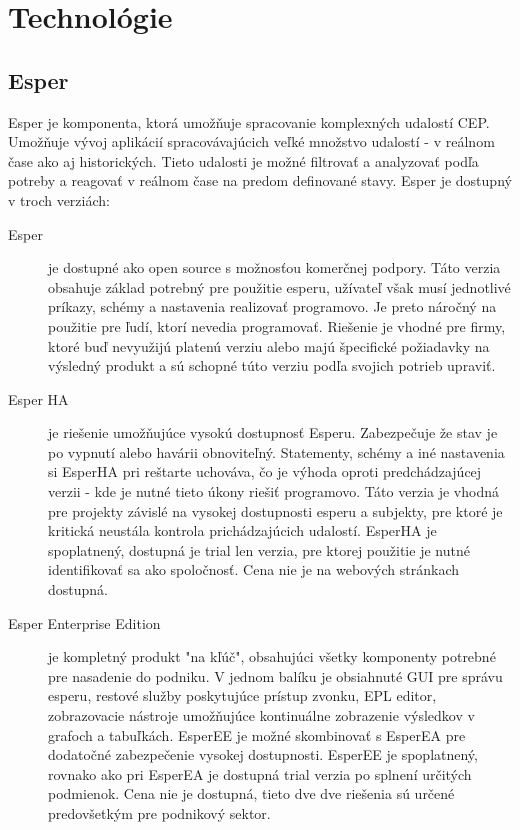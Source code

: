 \chapter{Technológie}
\label{chap:technologie}

\section{Esper}
	Esper je komponenta, ktorá umožňuje spracovanie komplexných udalostí \ac{CEP}. Umožňuje vývoj aplikácií spracovávajúcich veľké množstvo udalostí - v reálnom čase ako aj historických. Tieto udalosti je možné filtrovať a analyzovať podľa potreby a reagovať v reálnom čase na predom definované stavy.  Esper je dostupný v troch verziách:
	\begin{description}
		\item[Esper] je dostupné ako open source s možnosťou komerčnej podpory. Táto verzia obsahuje základ potrebný pre použitie esperu, užívateľ však musí jednotlivé príkazy, schémy a nastavenia realizovať programovo. Je preto náročný na použitie pre ľudí, ktorí nevedia programovať. Riešenie je vhodné pre firmy, ktoré buď nevyužijú platenú verziu alebo majú špecifické požiadavky na výsledný produkt a sú schopné túto verziu podľa svojich potrieb upraviť.
		
		\item[Esper HA] je riešenie umožňujúce vysokú dostupnosť Esperu. Zabezpečuje že stav je po vypnutí alebo havárii obnoviteľný. Statementy, schémy a iné nastavenia si EsperHA pri reštarte uchováva, čo je výhoda oproti predchádzajúcej verzii - kde je nutné tieto úkony riešiť programovo. Táto verzia je vhodná pre projekty závislé na vysokej dostupnosti esperu a subjekty, pre ktoré je kritická neustála kontrola prichádzajúcich udalostí.
		EsperHA je spoplatnený, dostupná je trial len verzia, pre ktorej použitie je nutné identifikovať sa ako spoločnosť. Cena nie je na webových stránkach dostupná.
		
		\item[Esper Enterprise Edition] je kompletný produkt "na kľúč", obsahujúci všetky komponenty potrebné pre nasadenie do podniku. V jednom balíku je obsiahnuté GUI pre správu esperu, restové služby poskytujúce prístup zvonku, \ac{EPL} editor, zobrazovacie nástroje umožňujúce kontinuálne zobrazenie výsledkov v grafoch a tabuľkách. EsperEE je možné skombinovať s EsperEA pre dodatočné zabezpečenie vysokej dostupnosti. EsperEE je spoplatnený, rovnako ako pri EsperEA je dostupná trial verzia po splnení určitých podmienok. Cena nie je dostupná, tieto dve dve riešenia sú určené predovšetkým pre podnikový sektor.
	\end{description}
	
